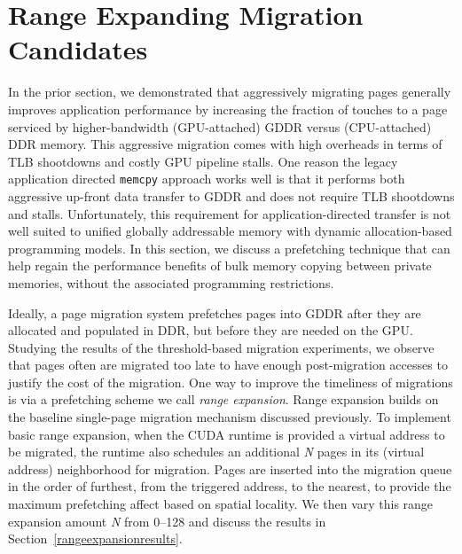 \vspace{-0.05in}
\section{Range Expanding Migration Candidates}
\label{rangeexpansion}
\vspace{-0.05in}

In the prior section, we demonstrated that aggressively migrating pages generally improves application performance
by increasing the fraction of touches to a page serviced by higher-bandwidth (GPU-attached) GDDR versus (CPU-attached) DDR memory.  This
aggressive migration comes with high overheads in terms of TLB shootdowns and costly GPU pipeline stalls.  
One reason the legacy application directed {\tt memcpy} approach works well is that it performs both aggressive 
up-front data transfer to GDDR and does not require TLB shootdowns and stalls.  
Unfortunately, this requirement for application-directed transfer is not well suited to 
unified globally addressable memory with dynamic allocation-based programming models. 
In this section, we discuss a prefetching technique that can help regain the performance 
benefits of bulk memory copying between private memories, without the associated programming
restrictions.

Ideally, a page migration system prefetches pages into GDDR after they are allocated and populated in DDR, 
but before they are needed on the GPU\@.  Studying the results of the threshold-based migration experiments, 
we observe that pages often are migrated too late to have enough post-migration accesses to justify the 
cost of the migration.  One way to improve the timeliness of migrations is via a prefetching scheme 
we call \emph{range expansion}.   Range expansion builds on the baseline single-page migration mechanism
discussed previously. To implement basic range expansion, when the CUDA runtime is provided a virtual address to
be migrated, the runtime also schedules an additional \emph{N} pages in its (virtual address) neighborhood 
for migration.  Pages are inserted into the migration queue in the order of furthest, from the triggered address,
to the nearest, to provide the maximum prefetching affect based on spatial locality.
We then vary this range expansion amount \emph{N} from 0--128 and discuss the results in Section~\ref{rangeexpansionresults}.

